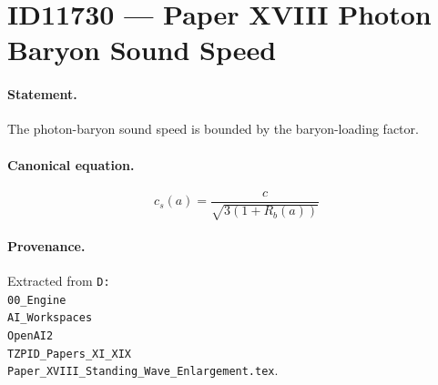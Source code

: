 \section*{ID11730 --- Paper XVIII Photon Baryon Sound Speed}

\paragraph{Statement.}
The photon-baryon sound speed is bounded by the baryon-loading factor.

\paragraph{Canonical equation.}
\[
c_s(a)=\frac{c}{\sqrt{3(1+R_b(a))}}
\]

\paragraph{Provenance.}
Extracted from \texttt{D:\\00\_Engine\\AI\_Workspaces\\OpenAI2\\TZPID\_Papers\_XI\_XIX\\Paper\_XVIII\_Standing\_Wave\_Enlargement.tex}.
